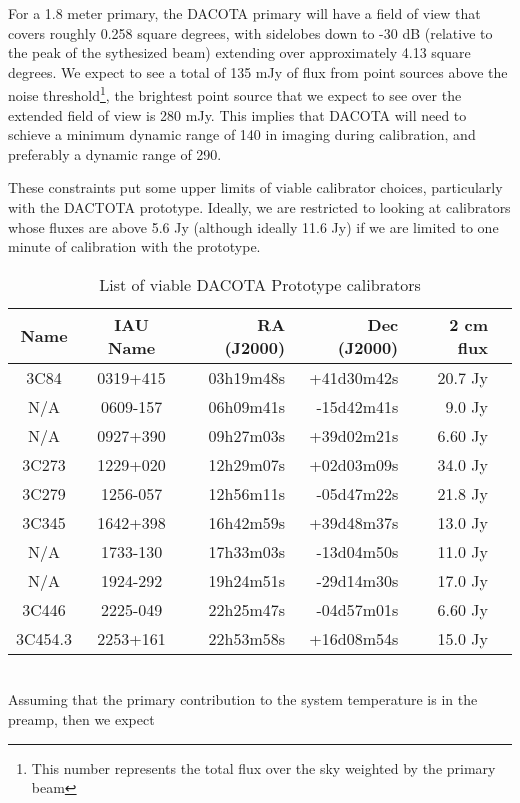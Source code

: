 \documentclass[preprint]{aastex}
\begin{document}
For a 1.8 meter primary, the DACOTA primary will have a field of view that covers roughly 0.258 square degrees, with sidelobes down to -30 dB (relative to the peak of the sythesized beam) extending over approximately 4.13 square degrees. We expect to see a total of 135 mJy of flux from point sources above the noise threshold\footnote{This number represents the total flux over the sky weighted by the primary beam}, the brightest point source that we expect to see over the extended field of view is 280 mJy. This implies that DACOTA will need to schieve a minimum dynamic range of 140 in imaging during calibration, and preferably a dynamic range of 290.

These constraints put some upper limits of viable calibrator choices, particularly with the DACTOTA prototype. Ideally, we are restricted to looking at calibrators whose fluxes are above 5.6 Jy (although ideally 11.6 Jy) if we are limited to one minute of calibration with the prototype. 
\begin{table}
\begin{center}
\label{List of Calibrators}
\begin{tabular}{|c|c||r|r|r|r|} \hline
Name & IAU Name & RA (J2000) & Dec (J2000) & 2 cm flux \\
\hline
\hline
3C84 & 0319+415 & 03h19m48s & +41d30m42s & 20.7 Jy \\
N/A & 0609-157 & 06h09m41s & -15d42m41s & 9.0 Jy \\
N/A & 0927+390 & 09h27m03s & +39d02m21s & 6.60 Jy \\
3C273 & 1229+020 & 12h29m07s & +02d03m09s & 34.0 Jy \\
3C279 & 1256-057 & 12h56m11s & -05d47m22s & 21.8 Jy \\
3C345 & 1642+398 & 16h42m59s & +39d48m37s & 13.0 Jy \\
N/A & 1733-130 & 17h33m03s & -13d04m50s & 11.0 Jy \\
N/A & 1924-292 & 19h24m51s & -29d14m30s & 17.0 Jy \\
3C446 & 2225-049 & 22h25m47s & -04d57m01s & 6.60 Jy \\
3C454.3 & 2253+161 & 22h53m58s & +16d08m54s & 15.0 Jy \\
\hline
\end{tabular}
\caption{List of viable DACOTA Prototype calibrators\label{tablecal}} 
\end{center}
\end{table}
\\
Assuming that the primary contribution to the system temperature is in the preamp, then we expect 
\end{document}
